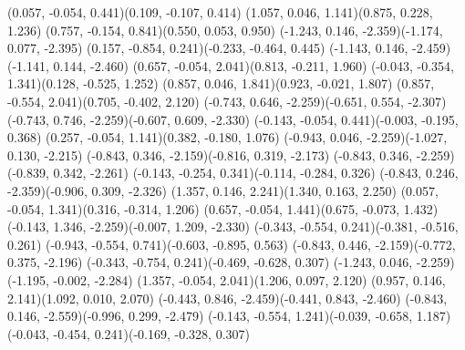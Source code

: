 \pstThreeDLine[linecolor=black](0.057, -0.054, 0.441)(0.109, -0.107, 0.414)
\pstThreeDLine[linecolor=gray](1.057, 0.046, 1.141)(0.875, 0.228, 1.236)
\pstThreeDLine[linecolor=gray](0.757, -0.154, 0.841)(0.550, 0.053, 0.950)
\pstThreeDLine[linecolor=black](-1.243, 0.146, -2.359)(-1.174, 0.077, -2.395)
\pstThreeDLine[linecolor=gray](0.157, -0.854, 0.241)(-0.233, -0.464, 0.445)
\pstThreeDLine[linecolor=gray](-1.143, 0.146, -2.459)(-1.141, 0.144, -2.460)
\pstThreeDLine[linecolor=black](0.657, -0.054, 2.041)(0.813, -0.211, 1.960)
\pstThreeDLine[linecolor=black](-0.043, -0.354, 1.341)(0.128, -0.525, 1.252)
\pstThreeDLine[linecolor=black](0.857, 0.046, 1.841)(0.923, -0.021, 1.807)
\pstThreeDLine[linecolor=gray](0.857, -0.554, 2.041)(0.705, -0.402, 2.120)
\pstThreeDLine[linecolor=black](-0.743, 0.646, -2.259)(-0.651, 0.554, -2.307)
\pstThreeDLine[linecolor=black](-0.743, 0.746, -2.259)(-0.607, 0.609, -2.330)
\pstThreeDLine[linecolor=black](-0.143, -0.054, 0.441)(-0.003, -0.195, 0.368)
\pstThreeDLine[linecolor=black](0.257, -0.054, 1.141)(0.382, -0.180, 1.076)
\pstThreeDLine[linecolor=gray](-0.943, 0.046, -2.259)(-1.027, 0.130, -2.215)
\pstThreeDLine[linecolor=black](-0.843, 0.346, -2.159)(-0.816, 0.319, -2.173)
\pstThreeDLine[linecolor=gray](-0.843, 0.346, -2.259)(-0.839, 0.342, -2.261)
\pstThreeDLine[linecolor=black](-0.143, -0.254, 0.341)(-0.114, -0.284, 0.326)
\pstThreeDLine[linecolor=gray](-0.843, 0.246, -2.359)(-0.906, 0.309, -2.326)
\pstThreeDLine[linecolor=gray](1.357, 0.146, 2.241)(1.340, 0.163, 2.250)
\pstThreeDLine[linecolor=black](0.057, -0.054, 1.341)(0.316, -0.314, 1.206)
\pstThreeDLine[linecolor=black](0.657, -0.054, 1.441)(0.675, -0.073, 1.432)
\pstThreeDLine[linecolor=black](-0.143, 1.346, -2.259)(-0.007, 1.209, -2.330)
\pstThreeDLine[linecolor=gray](-0.343, -0.554, 0.241)(-0.381, -0.516, 0.261)
\pstThreeDLine[linecolor=black](-0.943, -0.554, 0.741)(-0.603, -0.895, 0.563)
\pstThreeDLine[linecolor=black](-0.843, 0.446, -2.159)(-0.772, 0.375, -2.196)
\pstThreeDLine[linecolor=gray](-0.343, -0.754, 0.241)(-0.469, -0.628, 0.307)
\pstThreeDLine[linecolor=black](-1.243, 0.046, -2.259)(-1.195, -0.002, -2.284)
\pstThreeDLine[linecolor=gray](1.357, -0.054, 2.041)(1.206, 0.097, 2.120)
\pstThreeDLine[linecolor=black](0.957, 0.146, 2.141)(1.092, 0.010, 2.070)
\pstThreeDLine[linecolor=gray](-0.443, 0.846, -2.459)(-0.441, 0.843, -2.460)
\pstThreeDLine[linecolor=gray](-0.843, 0.146, -2.559)(-0.996, 0.299, -2.479)
\pstThreeDLine[linecolor=black](-0.143, -0.554, 1.241)(-0.039, -0.658, 1.187)
\pstThreeDLine[linecolor=gray](-0.043, -0.454, 0.241)(-0.169, -0.328, 0.307)
